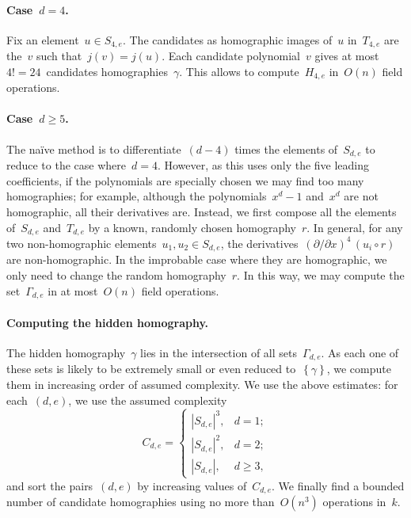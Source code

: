 \documentclass{lms}%
\def\acco#1{\left\{#1\right\}}
\def\abs#1{\left|#1\right|}
\def\card#1{\abs{#1}}
\begin{document}
\paragraph{Case~$d = 4$.}
Fix an element~$u ∈ S_{4,e}$. The candidates as homographic images of~$u$
in~$T_{4,e}$ are the~$v$ such that~$j(v) = j(u)$. Each candidate
polynomial~$v$ gives at most $4! = 24$~candidates homographies~$γ$. This
allows to compute~$H_{4,e}$ in~$O(n)$ field operations.

\paragraph{Case~$d ≥ 5$.} The naïve method is to differentiate~$(d-4)$
times the elements of~$S_{d,e}$ to reduce to the case where~$d = 4$.
However, as this uses only the five leading coefficients, if the
polynomials are specially chosen we may find too many homographies; for
example, although the polynomials~$x^d-1$ and~$x^d$ are not homographic,
all their derivatives are. Instead, we first compose all the elements
of~$S_{d,e}$ and~$T_{d,e}$ by a known, randomly chosen homography~$r$. In
general, for any two non-homographic elements~$u_1, u_2 ∈ S_{d,e}$, the
derivatives~$(∂/∂x)^4\, (u_i ∘ r)$ are non-homographic. In the improbable
case where they are homographic, we only need to change the random
homography~$r$. In this way, we may compute the set~$Γ_{d,e}$ in at
most~$O(n)$ field operations.

\paragraph{Computing the hidden homography.}

The hidden homography~$γ$ lies in the intersection of all sets~$Γ_{d,e}$.
As each one of these sets is likely to be extremely small or even reduced
to~$\acco{γ}$, we compute them in increasing order of assumed complexity.
We use the above estimates: for each~$(d,e)$, we use the assumed complexity
\begin{equation}
C_{d,e} = \begin{cases}
\card{S_{d,e}}^3,& d = 1;\\
\card{S_{d,e}}^2,& d = 2;\\
\card{S_{d,e}},& d≥ 3,
\end{cases}
\end{equation}
and sort the pairs~$(d,e)$ by increasing values of~$C_{d,e}$. We finally
find a bounded number of candidate homographies using no more
than~$O(n^3)$ operations in~$k$.
\end{document}
